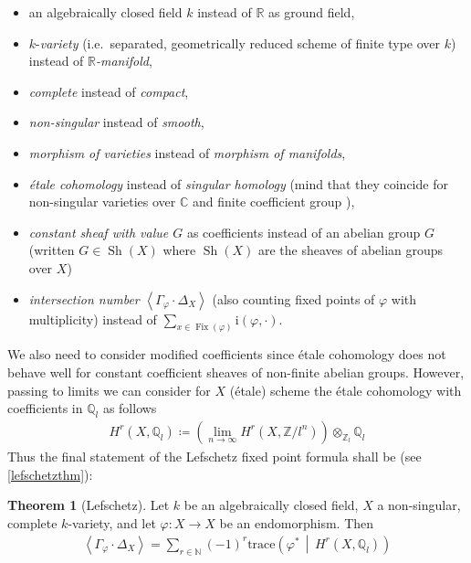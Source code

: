 \documentclass[english]{scrartcl}
\theoremstyle{definition}
\newtheorem{Thm}[Def]{Theorem}
\theoremstyle{remark}
\newcommand*{\N}{\mathds{N}}
\newcommand*{\Z}{\mathds{Z}}
\newcommand*{\Q}{\mathds{Q}}
\newcommand*{\R}{\mathds{R}}
\newcommand*{\C}{\mathds{C}}
\newcommand*{\Zmod}[1]{\Z/#1} %
\newcommand*{\Zl}{\Z_l} %
\newcommand*{\Ql}{\Q_l} %
\DeclareMathOperator{\Sh}{Sh} %
\newcommand*{\idest}{i.e.\ }
\newcommand*{\intProd}[2]{{#1\cdot#2}} %
\newcommand*{\intNum}[1]{{\left\langle{#1}\right\rangle}} %
\newcommand*{\Graph}[1]{{\Gamma_{#1}}} %
\newcommand*{\Diag}[1]{{\Delta_{#1}}} %
\newcommand*{\trace}[2]{{\text{trace}\left(#1 \,\middle|\, #2 \right)}} %
\renewcommand*{\phi}{\varphi}
\begin{document}
\begin{itemize}
\item an algebraically closed field $k$ instead of $\R$ as ground field,
\item $k$-\emph{variety}
  (\idest separated, geometrically reduced scheme of finite type over $k$)
  instead of \emph{$\R$-manifold},
\item \emph{complete} instead of \emph{compact},
\item \emph{non-singular} instead of \emph{smooth},
\item \emph{morphism of varieties} instead of \emph{morphism of manifolds},
\item \emph{étale cohomology} instead of \emph{singular homology}
  (mind that they coincide for non-singular varieties over $\C$ and
  finite coefficient group \cite[see][Thm.~I.21.1]{milne}),
\item \emph{constant sheaf with value $G$}
  as coefficients instead of an abelian group $G$
  (written $G\in\Sh(X)$ where
  $\Sh(X)$ are the sheaves of abelian groups over $X$)
\item \emph{intersection number} $\intNum{\intProd{\Graph{\phi}}{\Diag{X}}}$
  (also counting fixed points of $\phi$ with multiplicity)
  instead of $\sum_{x\in\operatorname{Fix}(\phi)}\mathrm{i}(\phi,\cdot)$.
\end{itemize}
We also need to consider modified coefficients since étale cohomology
does not behave well for constant coefficient sheaves of non-finite
abelian groups. However, passing to limits we can consider for $X$
(étale) scheme the étale cohomology with coefficients in $\Ql$ as follows
\begin{gather*}
  H^r(X,\Ql)\coloneqq
  \left(\lim_{n\to\infty}H^r(X,\Zmod{l^n})\right)\otimes_{\Zl}\Ql
\end{gather*}
Thus the final statement of the Lefschetz fixed point formula shall be
(see \ref{lefschetzthm}):
\begin{Thm}[Lefschetz]\label{lefschetzthm:motivation}
  Let $k$ be an algebraically closed field, $X$ a non-singular,
  complete $k$-variety, and let $\phi\colon X\to X$ be an
  endomorphism. Then
  \begin{gather*}
    \intNum{\intProd{\Graph{\phi}}{\Diag{X}}}
    = \sum_{r\in\N}(-1)^r\trace{\phi^*}{H^r(X,\Ql)}
  \end{gather*}
\end{Thm}
\end{document}
